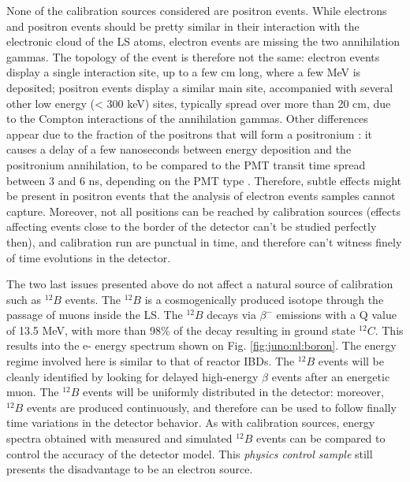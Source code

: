 \documentclass[../main.tex]{subfiles}
\begin{document}
None of the calibration sources considered are positron events. While electrons and positron events should be pretty similar in their interaction with the electronic cloud of the LS atoms,
electron events are missing the two annihilation gammas. The topology of the event is therefore not the same: electron events display a single interaction site, up to a few cm long, where a few MeV is deposited; positron events display a similar main site, accompanied with several other low energy (< 300 keV) sites, typically spread over more than 20 cm, due to the Compton interactions of the annihilation gammas. Other differences appear due to the fraction of the positrons that will  form a positronium : it causes a delay of a few nanoseconds between  energy deposition and the positronium annihilation, to be compared to the PMT  transit time spread between 3 and 6 ns, depending on the PMT type \cite{rodphai_20-inch_2021, liao_study_2017, li_characterization_2018}. Therefore, subtle effects might be present in positron events that the analysis of electron events samples cannot capture. Moreover, not all positions can be reached by calibration sources (effects affecting events close to the border of the detector can't be studied perfectly then), and calibration run are punctual in time, and therefore can't witness finely of time evolutions in the detector.

The two last issues presented above do not affect a natural source of calibration such as $^{12}B$ events. The $^{12}B$ is a cosmogenically produced isotope through the passage of muons inside the LS. The $^{12}B$ decays via $\beta^-$ emissions with a Q value of 13.5 MeV, with more than 98\% of the decay resulting in ground state $^{12}C$. This results into the e- energy spectrum shown on Fig. \ref{fig:juno:nl:boron}. The energy regime involved here is similar to that of reactor IBDs. The $^{12}B$ events will be cleanly identified by looking for delayed high-energy $\beta$ events after an energetic muon. The $^{12}B$ events will be uniformly distributed in the detector: moreover, $^{12}B$ events are produced continuously, and therefore can be used to follow finally time variations in the detector behavior. As with calibration sources, energy spectra obtained with measured and simulated $^{12}B$ events can be compared to control the accuracy of the detector model. This \textit{physics control sample} still presents the disadvantage to be an electron source.
\end{document}
